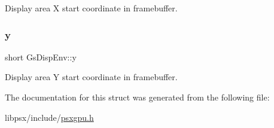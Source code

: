 Display area X start coordinate in framebuffer. 

\mbox{\label{structGsDispEnv_ab1007184f6890f7f628699f43b553250}} 
\subsubsection{\texorpdfstring{y}{y}}
{\footnotesize\ttfamily short Gs\+Disp\+Env\+::y}



Display area Y start coordinate in framebuffer. 



The documentation for this struct was generated from the following file\+:\begin{DoxyCompactItemize}
\item 
libpsx/include/\hyperlink{psxgpu_8h}{psxgpu.\+h}\end{DoxyCompactItemize}
